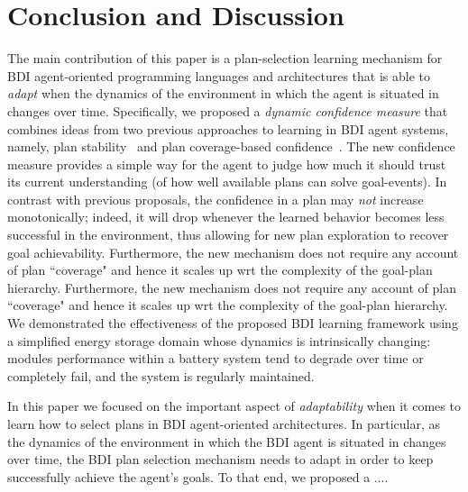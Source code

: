 \section{Conclusion and Discussion}\label{sec:discussion}

The main contribution of this paper is a plan-selection learning mechanism for BDI agent-oriented programming languages and architectures that is able to \emph{adapt} when the dynamics of the environment in which the agent is situated in changes over time.
Specifically, we proposed a \emph{dynamic confidence measure} that combines ideas from two previous approaches to learning in BDI agent systems, namely, plan stability~\cite{airiau09:enhancing} and plan coverage-based confidence~\cite{singh10:extending}. The new confidence measure provides a simple way for the agent to judge how much it should trust its current understanding (of how well available plans can solve goal-events). 
In contrast with previous proposals, the confidence in a plan may \emph{not} increase monotonically; indeed, it will drop whenever the learned behavior becomes less successful in the environment, thus allowing for new plan exploration to recover goal achievability. Furthermore, the new mechanism does not require any account of plan ``coverage" and hence it scales up wrt the complexity of the goal-plan hierarchy. Furthermore, the new mechanism does not require any account of plan ``coverage" and hence it scales up wrt the complexity of the goal-plan hierarchy.
We demonstrated the effectiveness of the proposed BDI learning framework using a simplified energy storage domain whose dynamics is intrinsically changing: modules performance within a battery system tend to degrade over time or completely fail, and the system is regularly maintained.  

In this paper we focused on the important aspect of \emph{adaptability} when it comes to learn how to select plans in BDI agent-oriented architectures. In particular, as the dynamics of the environment in which the BDI agent is situated in changes over time, the BDI plan selection mechanism needs to adapt in order to keep successfully achieve the agent's goals. 
To that end, we proposed a ....

